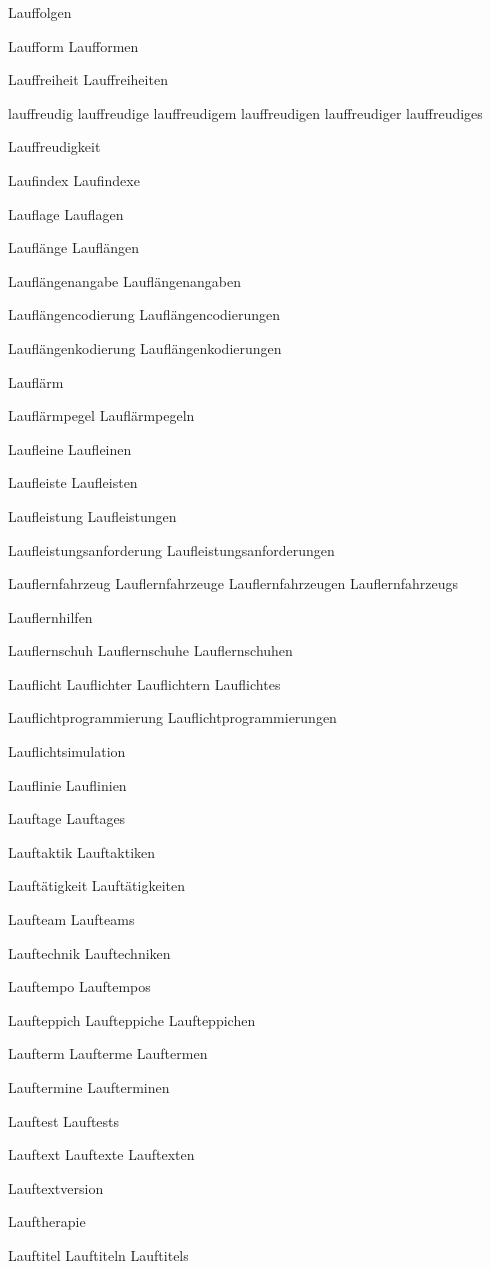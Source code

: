 Lauffolgen

Laufform
Laufformen

Lauffreiheit
Lauffreiheiten

lauffreudig
lauffreudige
lauffreudigem
lauffreudigen
lauffreudiger
lauffreudiges

Lauffreudigkeit

Laufindex
Laufindexe

Lauflage
Lauflagen

Lauflänge
Lauflängen

Lauflängenangabe
Lauflängenangaben

Lauflängencodierung
Lauflängencodierungen

Lauflängenkodierung
Lauflängenkodierungen

Lauflärm

Lauflärmpegel
Lauflärmpegeln

Laufleine
Laufleinen

Laufleiste
Laufleisten

Laufleistung
Laufleistungen

Laufleistungsanforderung
Laufleistungsanforderungen

Lauflernfahrzeug
Lauflernfahrzeuge
Lauflernfahrzeugen
Lauflernfahrzeugs

Lauflernhilfen

Lauflernschuh
Lauflernschuhe
Lauflernschuhen

Lauflicht
Lauflichter
Lauflichtern
Lauflichtes

Lauflichtprogrammierung
Lauflichtprogrammierungen

Lauflichtsimulation

Lauflinie
Lauflinien

Lauftage
Lauftages

Lauftaktik
Lauftaktiken

Lauftätigkeit
Lauftätigkeiten

Laufteam
Laufteams

Lauftechnik
Lauftechniken

Lauftempo
Lauftempos

Laufteppich
Laufteppiche
Laufteppichen

Laufterm
Laufterme
Lauftermen

Lauftermine
Laufterminen

Lauftest
Lauftests

Lauftext
Lauftexte
Lauftexten

Lauftextversion

Lauftherapie

Lauftitel
Lauftiteln
Lauftitels

